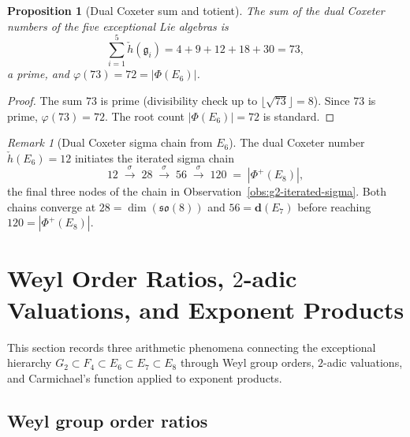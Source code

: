 \documentclass[11pt]{amsart}
\theoremstyle{plain}
\newtheorem{proposition}[theorem]{Proposition}
\theoremstyle{definition}
\theoremstyle{remark}
\newtheorem{remark}[theorem]{Remark}
\renewcommand{\Phi}{\varPhi}
\begin{document}
\begin{proposition}[Dual Coxeter sum and totient]\label{prop:hdual-sum}
The sum of the dual Coxeter numbers of the five exceptional Lie algebras is
\[
  \sum_{i=1}^{5} \check{h}(\mathfrak{g}_i) = 4+9+12+18+30 = 73,
\]
a prime, and $\varphi(73) = 72 = |\Phi(E_6)|$.
\end{proposition}

\begin{proof}
The sum $73$ is prime (divisibility check up to $\lfloor\sqrt{73}\rfloor = 8$).
Since $73$ is prime, $\varphi(73) = 72$.
The root count $|\Phi(E_6)| = 72$ is standard.
\end{proof}

\begin{remark}[Dual Coxeter sigma chain from $E_6$]\label{rem:hdual-sigma-chain}
The dual Coxeter number $\check{h}(E_6) = 12$ initiates the iterated sigma chain
\[
  12 \;\xrightarrow{\sigma}\; 28 \;\xrightarrow{\sigma}\; 56
     \;\xrightarrow{\sigma}\; 120 \;=\; |\Phi^+(E_8)|,
\]
the final three nodes of the chain in Observation~\ref{obs:g2-iterated-sigma}.
Both chains converge at $28 = \dim(\mathfrak{so}(8))$ and
$56 = \mathbf{d}(E_7)$ before reaching $120 = |\Phi^+(E_8)|$.
\end{remark}

\section{Weyl Order Ratios, $2$-adic Valuations, and Exponent Products}%
\label{sec:weyl-padic}

This section records three arithmetic phenomena connecting the exceptional
hierarchy $G_2 \subset F_4 \subset E_6 \subset E_7 \subset E_8$ through
Weyl group orders, $2$-adic valuations, and Carmichael's function applied
to exponent products.

\subsection{Weyl group order ratios}
\label{subsec:weyl-order-ratios}
\end{document}
